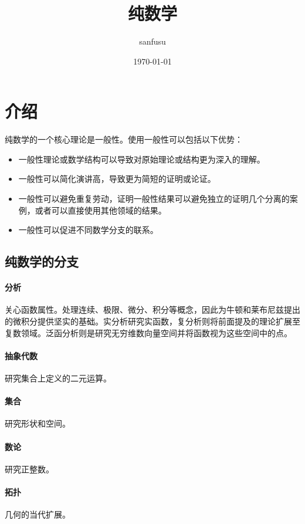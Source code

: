 
    \title{纯数学}
    \author{sanfusu}
    \date{\today}
    \maketitle

\section{介绍}
纯数学的一个核心理论是一般性。使用一般性可以包括以下优势：
\begin{itemize}
    \item 一般性理论或数学结构可以导致对原始理论或结构更为深入的理解。
    \item 一般性可以简化演讲高，导致更为简短的证明或论证。
    \item 一般性可以避免重复劳动，证明一般性结果可以避免独立的证明几个分离的案例，或者可以直接使用其他领域的结果。
    \item 一般性可以促进不同数学分支的联系。
\end{itemize}

\subsection{纯数学的分支}

\paragraph{分析} 关心函数属性。处理连续、极限、微分、积分等概念，因此为牛顿和莱布尼兹提出的微积分提供坚实的基础。实分析研究实函数，复分析则将前面提及的理论扩展至复数领域。泛函分析则是研究无穷维数向量空间并将函数视为这些空间中的点。
\paragraph{抽象代数} 研究集合上定义的二元运算。
\paragraph{集合} 研究形状和空间。
\paragraph{数论} 研究正整数。
\paragraph{拓扑} 几何的当代扩展。

